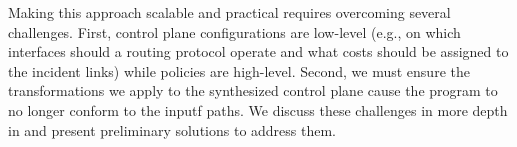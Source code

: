 
Making this approach scalable and practical requires overcoming several
challenges. First, control plane configurations are low-level (e.g., on which
interfaces should a routing protocol operate and what costs should be assigned
to the incident links) while policies are high-level. Second, we must ensure
the transformations we apply to the synthesized control plane cause the
program to no longer conform to the inputf paths.  We
discuss these challenges in more depth in  and present
preliminary solutions to address them.

